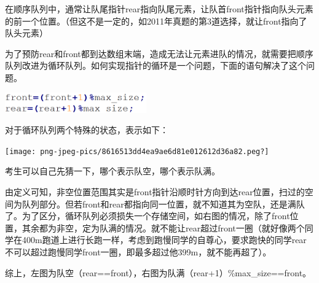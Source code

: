 在顺序队列中，{通常让队尾指针rear指向队尾元素，让队首front指针指向队头元素的前一个位置。}（但这不是一定的，如2011年真题的第3道选择，就让front指向了队头元素）

为了预防rear和front都到达数组末端，造成无法让元素进队的情况，就需要把顺序队列改进为循环队列。如何实现指针的循环是一个问题，下面的语句解决了这个问题。

\includegraphics[width=2.39583in,height=0.34375in]{png-jpeg-pics/E027815619E166F3A6DF9E1573525F07.png}

对于循环队列两个特殊的状态，表示如下：

\texttt{[image: png-jpeg-pics/8616513dd4ea9ae6d81e012612d36a82.peg?]}

考生可以自己先猜一下，哪个表示队空，哪个表示队满。

由定义可知，非空位置范围其实是front指针沿顺时针方向到达rear位置，扫过的空间为队列部分。但若front和rear都指向同一位置，就不知道其为空队，还是满队了。{为了区分，循环队列必须损失一个存储空间}，如右图的情况，除了front位置，其余都为非空，定为队满的情况。就不能让rear超过front一圈（就好像两个同学在400m跑道上进行长跑一样，考虑到跑慢同学的自尊心，要求跑快的同学rear不可以超过跑慢同学front一圈，即最多超过他399m，就不能再超了）。

综上，左图为队空（rear==front），右图为队满（rear+1）\%max\_size==front。
